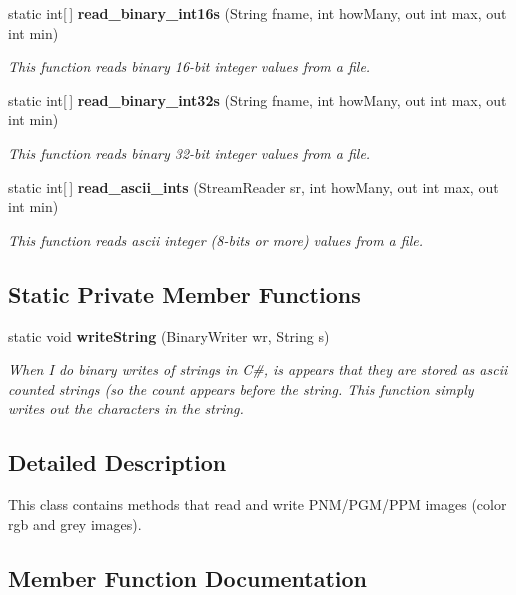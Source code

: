 \begin{CompactItemize}
static int[$\,$] {\bf read\_\-binary\_\-int16s} (String fname, int how\-Many, out int max, out int min)
\begin{CompactList}\small\item\em This function reads binary 16-bit integer values from a file. \item\end{CompactList}\item 
static int[$\,$] {\bf read\_\-binary\_\-int32s} (String fname, int how\-Many, out int max, out int min)
\begin{CompactList}\small\item\em This function reads binary 32-bit integer values from a file. \item\end{CompactList}\item 
static int[$\,$] {\bf read\_\-ascii\_\-ints} (Stream\-Reader sr, int how\-Many, out int max, out int min)
\begin{CompactList}\small\item\em This function reads ascii integer (8-bits or more) values from a file. \item\end{CompactList}\end{CompactItemize}
\subsection*{Static Private Member Functions}
\begin{CompactItemize}
\item 
static void {\bf write\-String} (Binary\-Writer wr, String s)
\begin{CompactList}\small\item\em When I do binary writes of strings in C\#, is appears that they are stored as ascii counted strings (so the count appears before the string. This function simply writes out the characters in the string. \item\end{CompactList}\end{CompactItemize}


\subsection{Detailed Description}
This class contains methods that read and write PNM/PGM/PPM images (color rgb and grey images). 



\subsection{Member Function Documentation}
